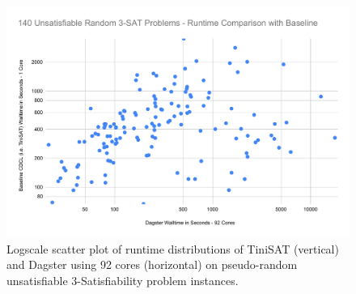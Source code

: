 \begin{figure}
  \centering
  \includegraphics[width=.8\columnwidth]{./figs/3UNSAT_140random.pdf}
  \caption[Scatterplot of Tinisat against Dagster for random unsatisfiable 3Sat instances]{Logscale scatter plot of runtime distributions of \mbox{TiniSAT} (vertical) and  \mbox{Dagster} using 92 cores (horizontal) on pseudo-random unsatisfiable $3$-Satisfiability problem instances.\label{fig:3UNSAT_140random}}
\end{figure}

